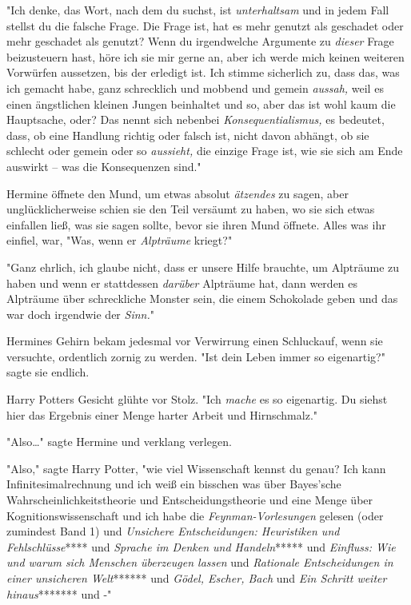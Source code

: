 {"Ich denke, das Wort, nach dem du suchst, ist \emph{unterhaltsam} und in jedem Fall stellst du die falsche Frage. Die Frage ist, hat es mehr genutzt als geschadet oder mehr geschadet als genutzt? Wenn du irgendwelche Argumente zu \emph{dieser} Frage beizusteuern hast, höre ich sie mir gerne an, aber ich werde mich keinen weiteren Vorwürfen aussetzen, bis der erledigt ist. Ich stimme sicherlich zu, dass das, was ich gemacht habe, ganz schrecklich und mobbend und gemein \emph{aussah,} weil es einen ängstlichen kleinen Jungen beinhaltet und so, aber das ist wohl kaum die Hauptsache, oder? Das nennt sich nebenbei \emph{Konsequentialismus,} es bedeutet, dass, ob eine Handlung richtig oder falsch ist, nicht davon abhängt, ob sie schlecht oder gemein oder so \emph{aussieht,} die einzige Frage ist, wie sie sich am Ende auswirkt -- was die Konsequenzen sind."

Hermine öffnete den Mund, um etwas absolut \emph{ätzendes} zu sagen, aber unglücklicherweise schien sie den Teil versäumt zu haben, wo sie sich etwas einfallen ließ, was sie sagen sollte, bevor sie ihren Mund öffnete. Alles was ihr einfiel, war, "Was, wenn er \emph{Alpträume} kriegt?"

"Ganz ehrlich, ich glaube nicht, dass er unsere Hilfe brauchte, um Alpträume zu haben und wenn er stattdessen \emph{darüber} Alpträume hat, dann werden es Alpträume über schreckliche Monster sein, die einem Schokolade geben und das war doch irgendwie der \emph{Sinn.}"

Hermines Gehirn bekam jedesmal vor Verwirrung einen Schluckauf, wenn sie versuchte, ordentlich zornig zu werden. "Ist dein Leben immer so eigenartig?" sagte sie endlich.

Harry Potters Gesicht glühte vor Stolz. "Ich \emph{mache} es so eigenartig. Du siehst hier das Ergebnis einer Menge harter Arbeit und Hirnschmalz."

"Also…" sagte Hermine und verklang verlegen.

"Also," sagte Harry Potter, "wie viel Wissenschaft kennst du genau? Ich kann Infinitesimalrechnung und ich weiß ein bisschen was über Bayes'sche Wahrscheinlichkeitstheorie und Entscheidungstheorie und eine Menge über Kognitionswissenschaft und ich habe die \emph{Feynman-Vorlesungen} gelesen (oder zumindest Band 1) und \emph{Unsichere Entscheidungen: Heuristiken und Fehlschlüsse}**** und \emph{Sprache im Denken und Handeln}***** und \emph{Einfluss: Wie und warum sich Menschen überzeugen lassen} und \emph{Rationale Entscheidungen in einer unsicheren Welt}****** und \emph{Gödel, Escher, Bach} und \emph{Ein Schritt weiter hinaus}******* und -"

}
